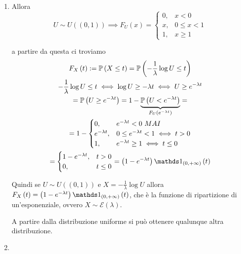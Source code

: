 \subsubsection{}
\begin{enumerate}
\item Allora\begin{equation*}
U\sim U\left(\left( 0,1\right)\right) \implies F_{U}\left( x\right) =\begin{cases}
0, & x< 0\\
x, & 0\leq x< 1\\
1, & x\geq 1
\end{cases}
\end{equation*}

a partire da questa ci troviamo\begin{gather*}
F_{X}\left( t\right) :=\mathbb{P}\left( X\leq t\right) =\mathbb{P}\left( -\frac{1}{\lambda }\log U\leq t\right)\\
-\frac{1}{\lambda }\log U\leq t\iff \log U\geq -\lambda t\iff U\geq e^{-\lambda t}\\
=\mathbb{P}\left( U\geq e^{-\lambda t}\right) =1-\underbrace{\mathbb{P}\left( U< e^{-\lambda t}\right)}_{F_{U}\left( e^{-\lambda t}\right)} =\\
=1-\begin{cases}
0, & e^{-\lambda t} < 0\ MAI\\
e^{-\lambda t} , & 0\leq e^{-\lambda t} < 1\iff t >0\\
1, & e^{-\lambda t} \geq 1\iff t\leq 0
\end{cases}\\
=\begin{cases}
1-e^{-\lambda t} , & t >0\\
0, & t\leq 0
\end{cases} =\left( 1-e^{-\lambda t}\right) \Ind_{\left( 0,+\infty \right)}\left( t\right)
\end{gather*}

Quindi se $U\sim U\left(\left( 0,1\right)\right)$ e $X=-\frac{1}{\lambda }\log U$ allora $F_{X}\left( t\right) =\left( 1-e^{-\lambda t}\right) \Ind_{\left( 0,+\infty \right)}\left( t\right)$, che è la funzione di ripartizione di un'esponenziale, ovvero $X\sim \mathcal{E}\left( \lambda \right)$.

A partire dalla distribuzione uniforme si può ottenere qualunque altra distribuzione.
\item 
\end{enumerate}
\Esercizio{}

